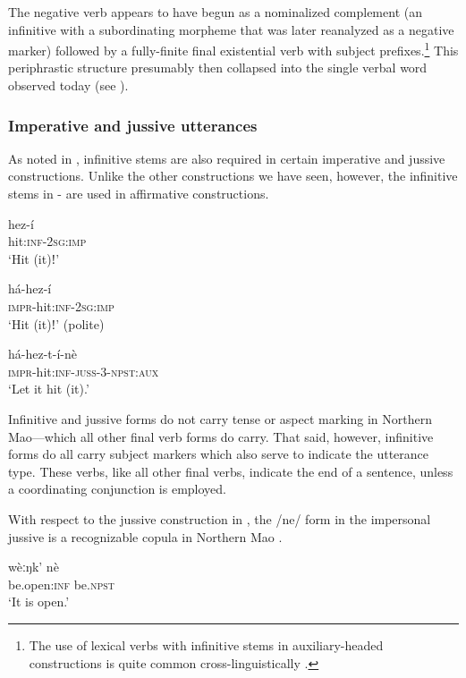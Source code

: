 \documentclass[output=paper]{langsci/langscibook}
\begin{document}
The negative verb appears to have begun as a nominalized complement (an infinitive with a subordinating morpheme that was later reanalyzed as a negative marker) followed by a fully-finite final existential verb with subject prefixes.\footnote{The use of lexical verbs with infinitive stems in auxiliary-headed constructions is quite common cross-linguistically \citep[56]{Anderson2006}.} This periphrastic structure presumably then collapsed into the single verbal word observed today (see ).

\subsubsection{Imperative and jussive utterances}\label{sec:mahland:3.1.2}


As noted in , infinitive stems are also required in certain imperative and jussive constructions. Unlike the other constructions we have seen, however, the infinitive stems in - are used in affirmative constructions. 

\ea\label{ex:mahland:61}
\gll hez-í\\
hit:\textsc{inf-2sg:imp}\\
\glt `Hit (it)ǃ'
\z

\ea\label{ex:mahland:62}
\gll há-hez-í\\
\textsc{impr}{}-hit\textsc{:inf-2sg:imp}\\
\glt `Hit (it)ǃ' (polite)
\z

\ea\label{ex:mahland:63}
\gll há-hez-t-í-nè\\
\textsc{impr}{}-hit:\textsc{inf-juss-3-npst:aux}\\
\glt `Let it hit (it).'
\z

Infinitive and jussive forms do not carry tense or aspect marking in Northern Mao—which all other final verb forms do carry. That said, however, infinitive forms do all carry subject markers which also serve to indicate the utterance type. These verbs, like all other final verbs, indicate the end of a sentence, unless a coordinating conjunction is employed.

With respect to the jussive construction in , the /ne/ form in the impersonal jussive  is a recognizable copula in Northern Mao  \citep[463]{Ahland2012}.

\ea\label{ex:mahland:64}
\gll wèːŋk'           nè\\
be.open\textsc{:inf}    be.\textsc{npst}\\
\glt `It is open.' 
\z
\end{document}

